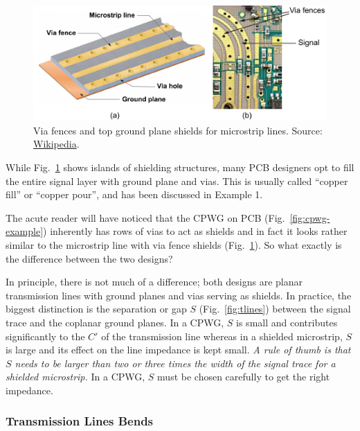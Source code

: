 \documentclass[12pt,letterpaper]{scrartcl}
\begin{document}
	\begin{figure}[hp]
		\centering
		\includegraphics[width=5.5in]{via-fence}
		\caption{Via fences and top ground plane shields for microstrip lines. Source: \href{https://en.wikipedia.org/wiki/Via_fence}{Wikipedia}.}
		\label{fig:via-fence}
	\end{figure}

While Fig.~\ref{fig:via-fence} shows islands of shielding structures, many PCB designers opt to fill the entire signal layer with ground plane and vias. This is usually called ``copper fill'' or ``copper pour'', and has been discussed in Example 1. 

The acute reader will have noticed that the CPWG on PCB (Fig.~\ref{fig:cpwg-example}) inherently has rows of vias to act as shields and in fact it looks rather similar to the microstrip line with via fence shields (Fig.~\ref{fig:via-fence}). So what exactly is the difference between the two designs?

In principle, there is not much of a difference; both designs are planar transmission lines with ground planes and vias serving as shields. In practice, the biggest distinction is the separation or gap $S$ (Fig.~\ref{fig:tlines}) between the signal trace and the coplanar ground planes. In a CPWG, $S$ is small and contributes significantly to the $C'$ of the transmission line whereas in a shielded microstrip, $S$ is large and its effect on the line impedance is kept small. \textit{A rule of thumb is that $S$ needs to be larger than two or three times the width of the signal trace for a shielded microstrip.} In a CPWG, $S$ must be chosen carefully to get the right impedance. 

\subsubsection{Transmission Lines Bends}
\end{document}
